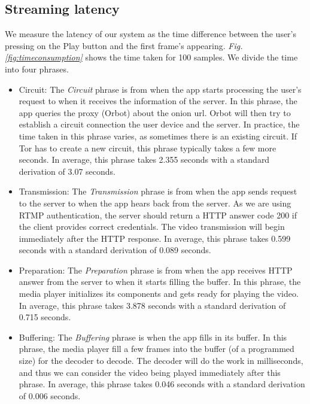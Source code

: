 \subsection{Streaming latency}
\label{subsec:streaming_latency}
We measure the latency of our system as the time difference between the user's pressing on the Play button and the first frame's appearing. \textit{Fig. \ref{fig:timeconsumption}} shows the time taken for 100 samples. We divide the time into four phrases.
\begin{itemize}
	\item Circuit: The \textit{Circuit} phrase is from when the app starts processing the user's request to when it receives the information of the server. In this phrase, the app queries the proxy (Orbot) about the onion url. Orbot will then try to establish a circuit connection the user device and the server. In practice, the time taken in this phrase varies, as sometimes there is an existing circuit. If Tor has to create a new circuit, this phrase typically takes a few more seconds. In average, this phrase takes 2.355 seconds with a standard derivation of 3.07 seconds.
	\item Transmission: The \textit{Transmission} phrase is from when the app sends request to the server to when the app hears back from the server. As we are using RTMP authentication, the server should return a HTTP answer code 200 if the client provides correct credentials. The video transmission will begin immediately after the HTTP response. In average, this phrase takes 0.599 seconds with a standard derivation of 0.089 seconds.
	\item Preparation: The \textit{Preparation} phrase is from when the app receives HTTP answer from the server to when it starts filling the buffer. In this phrase, the media player initializes its components and gets ready for playing the video. In average, this phrase takes 3.878 seconds with a standard derivation of 0.715 seconds.
	\item Buffering: The \textit{Buffering} phrase is when the app fills in its buffer. In this phrase, the media player fill a few frames into the buffer (of a programmed size) for the decoder to decode. The decoder will do the work in milliseconds, and thus we can consider the video being played immediately after this phrase. In average, this phrase takes 0.046 seconds with a standard derivation of 0.006 seconds.
\end{itemize}

